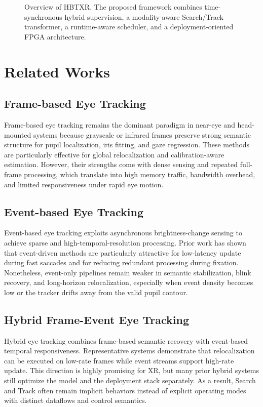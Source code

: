 \documentclass[journal]{IEEEtran}
\newcommand{\placeholderfigure}[2]{%
  \fbox{\parbox[c][#2][c]{#1}{\centering\vspace{2mm}\textbf{Figure placeholder}\\Final artwork pending\vspace{2mm}}}}
\begin{document}
\begin{figure}[t]
\centering
\placeholderfigure{0.93\textwidth}{2.0in}
\caption{Overview of HBTXR. The proposed framework combines time-synchronous hybrid supervision, a modality-aware Search/Track transformer, a runtime-aware scheduler, and a deployment-oriented FPGA architecture.}
\label{fig:overview}
\end{figure}

\section{Related Works}
\subsection{Frame-based Eye Tracking}
Frame-based eye tracking remains the dominant paradigm in near-eye and head-mounted systems because grayscale or infrared frames preserve strong semantic structure for pupil localization, iris fitting, and gaze regression. These methods are particularly effective for global relocalization and calibration-aware estimation. However, their strengths come with dense sensing and repeated full-frame processing, which translate into high memory traffic, bandwidth overhead, and limited responsiveness under rapid eye motion.

\subsection{Event-based Eye Tracking}
Event-based eye tracking exploits asynchronous brightness-change sensing to achieve sparse and high-temporal-resolution processing. Prior work has shown that event-driven methods are particularly attractive for low-latency update during fast saccades and for reducing redundant processing during fixation. Nonetheless, event-only pipelines remain weaker in semantic stabilization, blink recovery, and long-horizon relocalization, especially when event density becomes low or the tracker drifts away from the valid pupil contour.

\subsection{Hybrid Frame-Event Eye Tracking}
Hybrid eye tracking combines frame-based semantic recovery with event-based temporal responsiveness. Representative systems demonstrate that relocalization can be executed on low-rate frames while event streams support high-rate update. This direction is highly promising for XR, but many prior hybrid systems still optimize the model and the deployment stack separately. As a result, Search and Track often remain implicit behaviors instead of explicit operating modes with distinct dataflows and control semantics.
\end{document}
